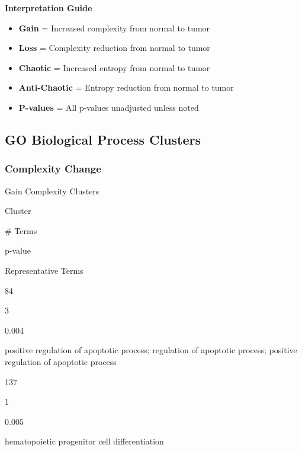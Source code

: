\documentclass[
  letterpaper,
  DIV=11,
  numbers=noendperiod,
  openany,
  oneside]{scrreprt}
\providecommand{\tightlist}{%
  \setlength{\itemsep}{0pt}\setlength{\parskip}{0pt}}
\begin{document}
\begin{tcolorbox}[enhanced jigsaw, opacityback=0, colframe=quarto-callout-note-color-frame, toptitle=1mm, colback=white, breakable, toprule=.15mm, bottomrule=.15mm, opacitybacktitle=0.6, title=\textcolor{quarto-callout-note-color}{\faInfo}\hspace{0.5em}{Note}, coltitle=black, rightrule=.15mm, leftrule=.75mm, left=2mm, bottomtitle=1mm, titlerule=0mm, colbacktitle=quarto-callout-note-color!10!white, arc=.35mm]

\textbf{Interpretation Guide}

\begin{itemize}
\tightlist
\item
  \textbf{Gain} = Increased complexity from normal to tumor
\item
  \textbf{Loss} = Complexity reduction from normal to tumor
\item
  \textbf{Chaotic} = Increased entropy from normal to tumor
\item
  \textbf{Anti-Chaotic} = Entropy reduction from normal to tumor
\item
  \textbf{P-values} = All p-values unadjusted unless noted
\end{itemize}

\end{tcolorbox}

\subsection{GO Biological Process Clusters}

\subsubsection{Complexity Change}

Gain Complexity Clusters

Cluster

\# Terms

p-value

Representative Terms

84

3

0.004

positive regulation of apoptotic process; regulation of apoptotic
process; positive regulation of apoptotic process

137

1

0.005

hematopoietic progenitor cell differentiation
\end{document}
